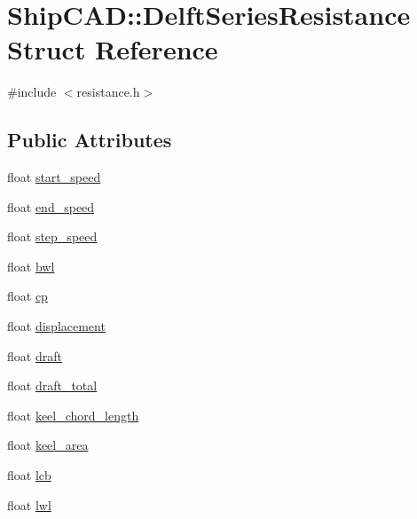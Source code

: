 \hypertarget{structShipCAD_1_1DelftSeriesResistance}{}\section{Ship\+C\+AD\+:\+:Delft\+Series\+Resistance Struct Reference}
\label{structShipCAD_1_1DelftSeriesResistance}


{\ttfamily \#include $<$resistance.\+h$>$}

\subsection*{Public Attributes}
\begin{DoxyCompactItemize}
\item 
float \hyperlink{structShipCAD_1_1DelftSeriesResistance_a040e0d678c7dbc24c29b7da618b4094d}{start\+\_\+speed}
\item 
float \hyperlink{structShipCAD_1_1DelftSeriesResistance_abd1672b905c07093735775ff455e5a98}{end\+\_\+speed}
\item 
float \hyperlink{structShipCAD_1_1DelftSeriesResistance_a0e3ee6d984afd4ddf1cf483261904574}{step\+\_\+speed}
\item 
float \hyperlink{structShipCAD_1_1DelftSeriesResistance_a160c7b99be523bcda5301231806af6b3}{bwl}
\item 
float \hyperlink{structShipCAD_1_1DelftSeriesResistance_ae489114ad6f1d03758420f77b58de519}{cp}
\item 
float \hyperlink{structShipCAD_1_1DelftSeriesResistance_a1c98fdc7b3c1b28f6f8029af2e009992}{displacement}
\item 
float \hyperlink{structShipCAD_1_1DelftSeriesResistance_a208e360c5ca0d029f9f433a7bc2cade2}{draft}
\item 
float \hyperlink{structShipCAD_1_1DelftSeriesResistance_a4db81049e448c381019f97dc630d51af}{draft\+\_\+total}
\item 
float \hyperlink{structShipCAD_1_1DelftSeriesResistance_a986244b5c6944f01dbdae5d54b895c84}{keel\+\_\+chord\+\_\+length}
\item 
float \hyperlink{structShipCAD_1_1DelftSeriesResistance_ab1bf49519c2ed054b7699898d7f5aead}{keel\+\_\+area}
\item 
float \hyperlink{structShipCAD_1_1DelftSeriesResistance_aca93b2c11316e29b2f98a3bdcdf65bc5}{lcb}
\item 
float \hyperlink{structShipCAD_1_1DelftSeriesResistance_a7232b8ea3003087a4772a650319ec8f2}{lwl}

\end{DoxyCompactItemize}
